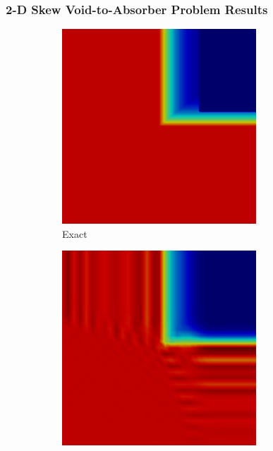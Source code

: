 \documentclass{beamer} \useoutertheme{infolines}
\begin{document}
\begin{frame}
\end{frame}
\begin{frame}
\frametitle{2-D Skew Void-to-Absorber Problem Results}

\begin{figure}[h]
   \centering
   \begin{subfigure}{0.3\textwidth}
      \includegraphics[width=0.8\textwidth]{./figures/skew_exact.png}
      \caption{Exact}
   \end{subfigure}
   \begin{subfigure}{0.3\textwidth}
      \includegraphics[width=0.8\textwidth]{./figures/skew_Gal.png}

\end{subfigure}
\end{figure}
\end{frame}
\end{document}
